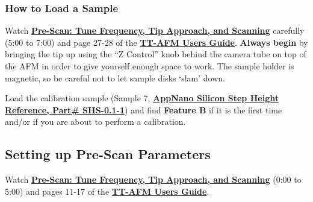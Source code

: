 \documentclass{../lab}
\newcommand{\afmuserguide}{\href{https://berkeley-physics111b.github.io/assets/pdf/oldwebsitestructure/AFMImages/TT_AFM\%20User-Guide-V2.2-600DPI.pdf}{\textbf{TT-AFM Users Guide}}}
\begin{document}
\subsubsection{How to Load a Sample}
\label{subsec:HowToLoadASample}

Watch \href{https://berkeley-physics111b.github.io/assets/pdf/oldwebsitestructure/prescan\_final\_0.mp4}{\textbf{Pre-Scan: Tune Frequency, Tip Approach, and Scanning}} carefully (5:00 to 7:00) and page 27-28 of the \afmuserguide. \textbf{Always begin} by bringing the tip up using the ``Z Control'' knob behind the camera tube on top of the AFM in order to give yourself enough space to work. The sample holder is magnetic, so be careful not to let sample disks `slam' down.

Load the calibration sample (Sample 7, \href{https://berkeley-physics111b.github.io/assets/pdf/oldwebsitestructure/AFMImages/Reference-\%20sample-SHS-01\_3\_datasheet.pdf}{\textbf{AppNano Silicon Step Height Reference, Part\# SHS-0.1-1}}) and find \textbf{Feature B} if it is the first time and/or if you are about to perform a calibration.

\subsection{Setting up Pre-Scan Parameters}
\label{subsec:SettingUpPreScanParametersForVibratingScan}

Watch \href{https://berkeley-physics111b.github.io/assets/pdf/oldwebsitestructure/prescan\_final2.mp4}{\textbf{Pre-Scan: Tune Frequency, Tip Approach, and Scanning}} (0:00 to 5:00) and pages 11-17 of the \afmuserguide. 
\end{document}
